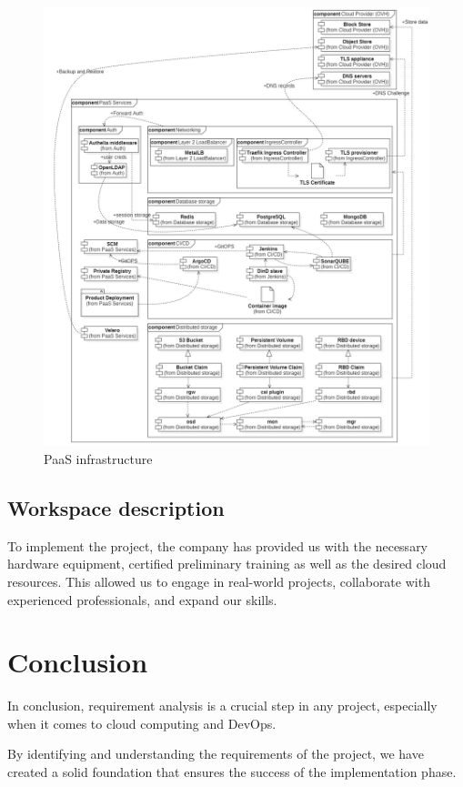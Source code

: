 \begin{figure}[H]\centering
\includegraphics[width=1.0\textwidth,angle=00]{assets/f8.jpg}
\caption{PaaS infrastructure}
\label{fig:f8}
\end{figure}

\newpage

\subsection{Workspace description}

To implement the project, the company has provided us with the necessary hardware equipment, certified preliminary training as well as the desired cloud resources. This allowed us to engage in real-world projects, collaborate with experienced professionals, and expand our skills.

\section*{Conclusion}
In conclusion, requirement analysis is a crucial step in any project, especially when it comes to cloud computing and DevOps.  

By identifying and understanding the requirements of the project, we have created a solid foundation that ensures the success of the implementation phase. 

